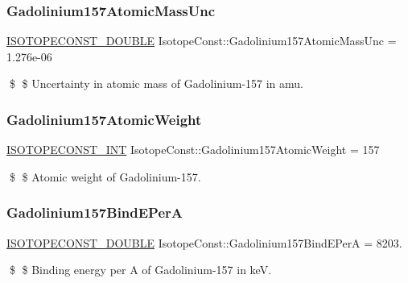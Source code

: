 \subsubsection{\texorpdfstring{Gadolinium157\+Atomic\+Mass\+Unc}{Gadolinium157AtomicMassUnc}}
{\footnotesize\ttfamily \mbox{\hyperlink{group___isotope_const-_macros_ga8f45a7272ce02c0b4c65c44636ed719a}{I\+S\+O\+T\+O\+P\+E\+C\+O\+N\+S\+T\+\_\+\+D\+O\+U\+B\+LE}} Isotope\+Const\+::\+Gadolinium157\+Atomic\+Mass\+Unc = 1.\+276e-\/06}

\$ \$ Uncertainty in atomic mass of Gadolinium-\/157 in amu. \mbox{\label{group___isotope_const-_gadolinium-_gd157_gabe4098571772fc236805073327acd749}} 
\subsubsection{\texorpdfstring{Gadolinium157\+Atomic\+Weight}{Gadolinium157AtomicWeight}}
{\footnotesize\ttfamily \mbox{\hyperlink{group___isotope_const-_macros_ga5f18360b3e99483a35c32d789e62621c}{I\+S\+O\+T\+O\+P\+E\+C\+O\+N\+S\+T\+\_\+\+I\+NT}} Isotope\+Const\+::\+Gadolinium157\+Atomic\+Weight = 157}

\$ \$ Atomic weight of Gadolinium-\/157. \mbox{\label{group___isotope_const-_gadolinium-_gd157_gaddb30bfa2b84475e883d9ef1fa5e12aa}} 
\subsubsection{\texorpdfstring{Gadolinium157\+Bind\+E\+PerA}{Gadolinium157BindEPerA}}
{\footnotesize\ttfamily \mbox{\hyperlink{group___isotope_const-_macros_ga8f45a7272ce02c0b4c65c44636ed719a}{I\+S\+O\+T\+O\+P\+E\+C\+O\+N\+S\+T\+\_\+\+D\+O\+U\+B\+LE}} Isotope\+Const\+::\+Gadolinium157\+Bind\+E\+PerA = 8203.}

\$ \$ Binding energy per A of Gadolinium-\/157 in keV. \mbox{\label{group___isotope_const-_gadolinium-_gd157_ga14a42caefb23181826dc42e573dfe448}} 
